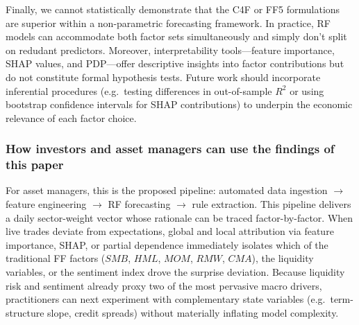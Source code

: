 Finally, we cannot statistically demonstrate that the C4F or FF5 formulations are superior within a non-parametric forecasting framework. In practice, RF models can accommodate both factor sets simultaneously and simply don't split on redudant predictors. Moreover, interpretability tools—feature importance, SHAP values, and PDP—offer descriptive insights into factor contributions but do not constitute formal hypothesis tests. Future work should incorporate inferential procedures (e.g.\ testing differences in out-of-sample $R^2$ or using bootstrap confidence intervals for SHAP contributions) to underpin the economic relevance of each factor choice.

\subsubsection{How investors and asset managers can use the findings of this paper}
For asset managers, this is the proposed pipeline: automated data ingestion $\rightarrow$ feature engineering $\rightarrow$ RF forecasting $\rightarrow$ rule extraction. This pipeline delivers a daily sector-weight vector whose rationale can be traced factor-by-factor. When live trades deviate from expectations, global and local attribution via feature importance, SHAP, or partial dependence immediately isolates which of the traditional FF factors ($SMB$, $HML$, $MOM$, $RMW$, $CMA$), the liquidity variables, or the sentiment index drove the surprise deviation. Because liquidity risk and sentiment already proxy two of the most pervasive macro drivers, practitioners can next experiment with complementary state variables (e.g.\ term-structure slope, credit spreads) without materially inflating model complexity.


